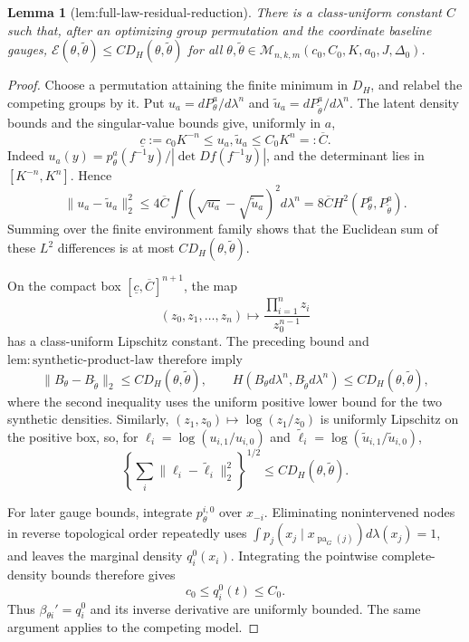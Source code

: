 \documentclass{article}
\newtheorem{lemma}{Lemma}
\begin{document}
\begin{lemma}[lem:full-law-residual-reduction]\label{lem:full-law-residual-reduction}
There is a class-uniform constant \(C\) such that, after an optimizing group permutation and the coordinate baseline gauges, \(\mathcal E(\theta,\widetilde\theta)\le C D_H(\theta,\widetilde\theta)\) for all \(\theta,\widetilde\theta\in\mathcal M_{n,k,m}(c_0,C_0,K,a_0,J,\Delta_0)\).
\end{lemma}
\begin{proof}
Choose a permutation attaining the finite minimum in \(D_H\), and relabel the competing groups by it. Put \(u_a=dP_\theta^a/d\lambda^n\) and \(\widetilde u_a=dP_{\widetilde\theta}^a/d\lambda^n\). The latent density bounds and the singular-value bounds give, uniformly in \(a\),
\[
\underline c:=c_0K^{-n}\le u_a,\widetilde u_a\le C_0K^n=:\overline C.
\]
Indeed \(u_a(y)=p_\theta^a(f^{-1}y)/|\det Df(f^{-1}y)|\), and the determinant lies in \([K^{-n},K^n]\). Hence
\[
\|u_a-\widetilde u_a\|_2^2
\le 4\overline C\int(\sqrt{u_a}-\sqrt{\widetilde u_a})^2d\lambda^n
=8\overline C H^2(P_\theta^a,P_{\widetilde\theta}^a).
\]
Summing over the finite environment family shows that the Euclidean sum of these \(L^2\) differences is at most \(C D_H(\theta,\widetilde\theta)\).

On the compact box \([\underline c,\overline C]^{n+1}\), the map
\[
(z_0,z_1,\ldots,z_n)\longmapsto
\frac{\prod_{i=1}^nz_i}{z_0^{n-1}}
\]
has a class-uniform Lipschitz constant. The preceding bound and \(\mathrm{lem:synthetic\text{-}product\text{-}law}\) therefore imply
\[
\|B_\theta-B_{\widetilde\theta}\|_2\le C D_H(\theta,\widetilde\theta),
\qquad
H(B_\theta d\lambda^n,B_{\widetilde\theta}d\lambda^n)
\le C D_H(\theta,\widetilde\theta),
\]
where the second inequality uses the uniform positive lower bound for the two synthetic densities. Similarly, \((z_1,z_0)\mapsto\log(z_1/z_0)\) is uniformly Lipschitz on the positive box, so, for
\(\ell_i=\log(u_{i,1}/u_{i,0})\) and \(\widetilde\ell_i=\log(\widetilde u_{i,1}/\widetilde u_{i,0})\),
\[
\left\{\sum_i\|\ell_i-\widetilde\ell_i\|_2^2\right\}^{1/2}
\le C D_H(\theta,\widetilde\theta).
\]

For later gauge bounds, integrate \(p_\theta^{i,0}\) over \(x_{-i}\). Eliminating nonintervened nodes in reverse topological order repeatedly uses
\(\int p_j(x_j\mid x_{\operatorname{pa}_G(j)})d\lambda(x_j)=1\), and leaves the marginal density \(q_i^0(x_i)\). Integrating the pointwise complete-density bounds therefore gives
\[
c_0\le q_i^0(t)\le C_0.
\]
Thus \(\beta_{\theta i}'=q_i^0\) and its inverse derivative are uniformly bounded. The same argument applies to the competing model.


\end{proof}
\end{document}
